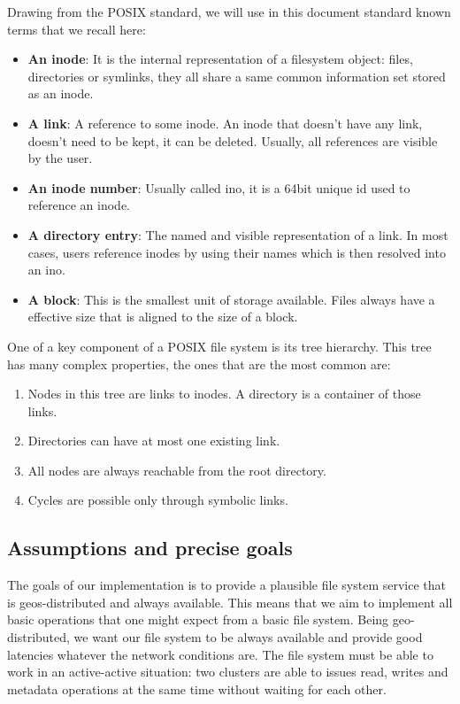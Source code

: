 \documentclass[sigplan, 10pt]{acmart}
\begin{document}
Drawing from the POSIX standard, we will use in this document standard known terms that
we recall here:

\begin{itemize}
    \item \textbf{An inode}: It is the internal representation of a filesystem object:
    files, directories or symlinks, they all share a same common information
    set stored as an inode.
    \item \textbf{A link}: A reference to some inode. An inode that doesn't have
    any link, doesn't need to be kept, it can be deleted. Usually, all references
    are visible by the user.
    \item \textbf{An inode number}: Usually called ino, it is
    a 64bit unique id used to reference an inode.
    \item \textbf{A directory entry}: The named and visible representation of
    a link. In most cases, users reference inodes by using their names which
    is then resolved into an ino.
    \item \textbf{A block}: This is the smallest unit of storage available.
    Files always have a effective size that is aligned to the size of a block.
\end{itemize}

One of a key component of a POSIX file system is its tree hierarchy.
This tree has many complex properties, the ones that are the most common are:

\begin{enumerate}
    \item Nodes in this tree are links to inodes. A directory is a container
    of those links.
    \item Directories can have at most one existing link.
    \item All nodes are always reachable from the root directory.
    \item Cycles are possible only through symbolic links.
\end{enumerate}

\subsection{Assumptions and precise goals}

The goals of our implementation is to provide a plausible file system service
that is geos-distributed and always available. This means that we aim to implement
all basic operations that one might expect from a basic file system. Being
geo-distributed, we want our file system to be always available and provide good
latencies whatever the network conditions are. The file system must be able to work
in an active-active situation: two clusters are able to issues read, writes and metadata
operations at the same time without waiting for each other.
\end{document}
